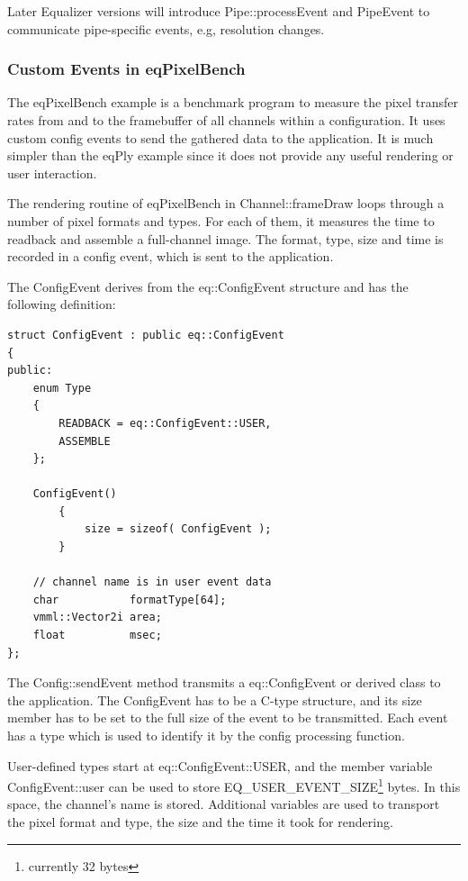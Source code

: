 \documentclass[10pt,a4]{scrartcl}
\begin{document}
Later Equalizer versions will introduce \textsf{Pipe::processEvent} and
\textsf{PipeEvent} to communicate pipe-specific events, e.g, resolution
changes.

\subsubsection{Custom Events in eqPixelBench}

The \textsf{eqPixelBench} example is a benchmark program to measure the
pixel transfer rates from and to the framebuffer of all channels within
a configuration. It uses custom config events to send the gathered data
to the application. It is much simpler than the \textsf{eqPly} example
since it does not provide any useful rendering or user interaction.

The rendering routine of \textsf{eqPixelBench} in
\textsf{Channel::frameDraw} loops through a number of pixel formats and
types. For each of them, it measures the time to readback and assemble a
full-channel image. The format, type, size and time is recorded in a
config event, which is sent to the application.

The \textsf{ConfigEvent} derives from the \textsf{eq::ConfigEvent}
structure and has the following definition:

{\footnotesize\begin{lstlisting}
struct ConfigEvent : public eq::ConfigEvent
{
public:
    enum Type
    {
        READBACK = eq::ConfigEvent::USER,
        ASSEMBLE
    };

    ConfigEvent()
        {
            size = sizeof( ConfigEvent );
        }

    // channel name is in user event data
    char           formatType[64];
    vmml::Vector2i area;
    float          msec;
};
\end{lstlisting}}

The \textsf{Config::sendEvent} method transmits a
\textsf{eq::ConfigEvent} or derived class to the application. The
ConfigEvent has to be a C-type structure, and its \textsf{size}
member has to be set to the full size of the event to be transmitted.
Each event has a type which is used to identify it by the config 
processing function.

User-defined types start at \textsf{eq::ConfigEvent::USER}, and the
member variable \textsf{ConfigEvent::user} can be used to store
\textsf{EQ\_USER\_EVENT\_SIZE}\footnote{currently 32 bytes} bytes. In
this space, the channel's name is stored. Additional variables are used
to transport the pixel format and type, the size and the time it took
for rendering.
\end{document}
